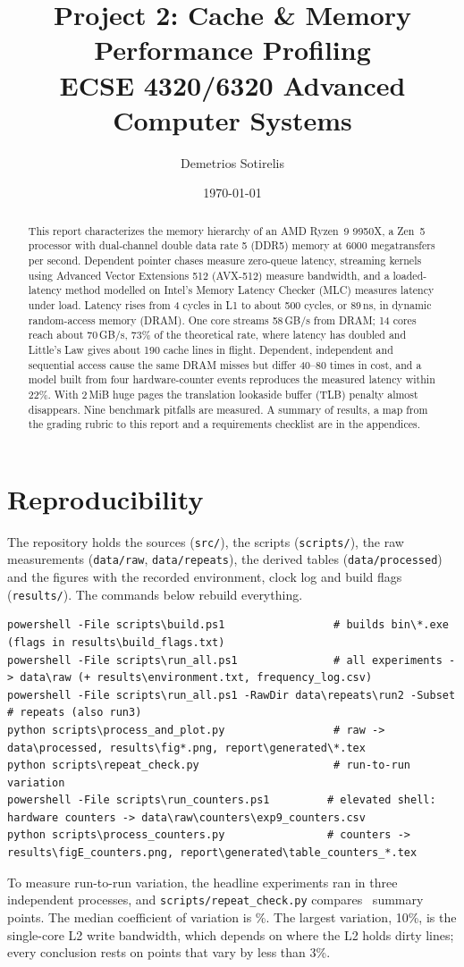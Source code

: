 \documentclass{article}
\title{Project 2: Cache \& Memory Performance Profiling\\[3pt]\large ECSE 4320/6320 Advanced Computer Systems}
\author{Demetrios Sotirelis}
\date{\today}
\begin{document}
\maketitle

\begin{abstract}
This report characterizes the memory hierarchy of an AMD Ryzen~9 9950X, a Zen~5 processor with dual-channel double data rate 5 (DDR5) memory at 6000 megatransfers per second. Dependent pointer chases measure zero-queue latency, streaming kernels using Advanced Vector Extensions 512 (AVX-512) measure bandwidth, and a loaded-latency method modelled on Intel's Memory Latency Checker (MLC) measures latency under load. Latency rises from 4 cycles in L1 to about 500 cycles, or 89\,ns, in dynamic random-access memory (DRAM). One core streams 58\,GB/s from DRAM; 14 cores reach about 70\,GB/s, 73\% of the theoretical rate, where latency has doubled and Little's Law gives about 190 cache lines in flight. Dependent, independent and sequential access cause the same DRAM misses but differ 40--80 times in cost, and a model built from four hardware-counter events reproduces the measured latency within 22\%. With 2\,MiB huge pages the translation lookaside buffer (TLB) penalty almost disappears. Nine benchmark pitfalls are measured. A summary of results, a map from the grading rubric to this report and a requirements checklist are in the appendices.
\end{abstract}

\section{Reproducibility}\label{sec:repro}
The repository holds the sources (\texttt{src/}), the scripts (\texttt{scripts/}), the raw measurements (\texttt{data/raw}, \texttt{data/repeats}), the derived tables (\texttt{data/processed}) and the figures with the recorded environment, clock log and build flags (\texttt{results/}). The commands below rebuild everything.
\begin{lstlisting}
powershell -File scripts\build.ps1                 # builds bin\*.exe (flags in results\build_flags.txt)
powershell -File scripts\run_all.ps1               # all experiments -> data\raw (+ results\environment.txt, frequency_log.csv)
powershell -File scripts\run_all.ps1 -RawDir data\repeats\run2 -Subset     # repeats (also run3)
python scripts\process_and_plot.py                 # raw -> data\processed, results\fig*.png, report\generated\*.tex
python scripts\repeat_check.py                     # run-to-run variation
powershell -File scripts\run_counters.ps1         # elevated shell: hardware counters -> data\raw\counters\exp9_counters.csv
python scripts\process_counters.py                # counters -> results\figE_counters.png, report\generated\table_counters_*.tex
\end{lstlisting}
To measure run-to-run variation, the headline experiments ran in three independent processes, and \nolinkurl{scripts/repeat_check.py} compares \runcvn\ summary points. The median coefficient of variation is \runcvmedian\%. The largest variation, 10\%, is the single-core L2 write bandwidth, which depends on where the L2 holds dirty lines; every conclusion rests on points that vary by less than 3\%.
\end{document}
